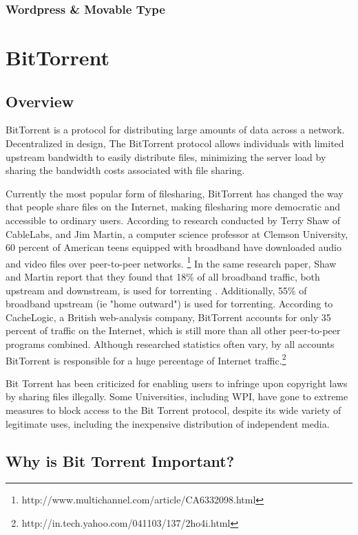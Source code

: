 \documentclass[a4paper,12pt]{report}
\begin{document}
\subsection {Wordpress & Movable Type}


\chapter{BitTorrent}
\section{Overview}
BitTorrent is a protocol for distributing large amounts of data across a network.
Decentralized in design, The BitTorrent protocol allows individuals with limited upstream bandwidth to easily distribute files, minimizing the server load by sharing the bandwidth costs associated with file sharing.

Currently the most popular form of filesharing, BitTorrent has changed the way that people share files on the Internet, making filesharing more democratic and accessible to ordinary users.
According to research conducted by Terry Shaw of CableLabs, and Jim Martin, a computer science professor at Clemson University, 60 percent of American teens equipped with broadband have downloaded audio and video files over peer-to-peer networks. \footnote { http://www.multichannel.com/article/CA6332098.html}
In the same research paper, Shaw and Martin report that they found that 18\% of all broadband traffic, both upstream and downstream, is used for torrenting .
Additionally, 55\% of broadband upstream (ie "home outward") is used for torrenting.
According to CacheLogic, a British web-analysis company, BitTorrent accounts for only 35 percent of traffic on the Internet, which is still more than all other peer-to-peer programs combined.  
Although researched statistics often vary, by all accounts BitTorrent is responsible for a huge percentage of Internet traffic.\footnote {http://in.tech.yahoo.com/041103/137/2ho4i.html}

Bit Torrent has been criticized for enabling users to infringe upon copyright laws by sharing files illegally. Some Universities, including WPI, have gone to extreme measures to block access to the Bit Torrent protocol, despite its wide variety of legitimate uses, including the inexpensive distribution of independent media.


\section{Why is Bit Torrent Important?}
\end{document}
